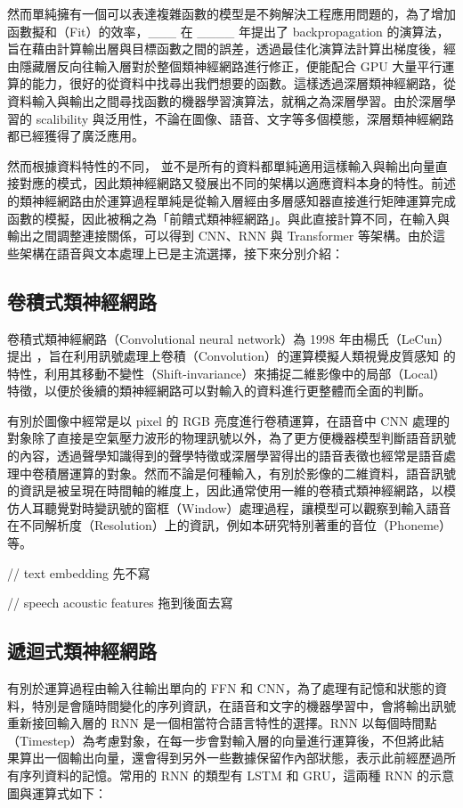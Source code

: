 然而單純擁有一個可以表達複雜函數的模型是不夠解決工程應用問題的，為了增加函數擬和（Fit）的效率，\_\_\_ 在 \_\_\_\_ 年提出了 backpropagation 的演算法，旨在藉由計算輸出層與目標函數之間的誤差，透過最佳化演算法計算出梯度後，經由隱藏層反向往輸入層對於整個類神經網路進行修正，便能配合 GPU 大量平行運算的能力，很好的從資料中找尋出我們想要的函數。這樣透過深層類神經網路，從資料輸入與輸出之間尋找函數的機器學習演算法，就稱之為深層學習。由於深層學習的 scalibility 與泛用性，不論在圖像、語音、文字等多個模態，深層類神經網路都已經獲得了廣泛應用。

然而根據資料特性的不同， 並不是所有的資料都單純適用這樣輸入與輸出向量直接對應的模式，因此類神經網路又發展出不同的架構以適應資料本身的特性。前述的類神經網路由於運算過程單純是從輸入層經由多層感知器直接進行矩陣運算完成函數的模擬，因此被稱之為「前饋式類神經網路」。與此直接計算不同，在輸入與輸出之間調整連接關係，可以得到 CNN、RNN 與 Transformer 等架構。由於這些架構在語音與文本處理上已是主流選擇，接下來分別介紹：

\subsection{卷積式類神經網路}

卷積式類神經網路（Convolutional neural network）為 1998 年由楊氏（LeCun）提出 \cite{lecun_gradient-based_1998}，旨在利用訊號處理上卷積（Convolution）的運算模擬人類視覺皮質感知 \cite{hubel_receptive_1959} 的特性，利用其移動不變性（Shift-invariance）來捕捉二維影像中的局部（Local）特徵，以便於後續的類神經網路可以對輸入的資料進行更整體而全面的判斷。

有別於圖像中經常是以 pixel 的 RGB 亮度進行卷積運算，在語音中 CNN 處理的對象除了直接是空氣壓力波形的物理訊號以外，為了更方便機器模型判斷語音訊號的內容，透過聲學知識得到的聲學特徵或深層學習得出的語音表徵也經常是語音處理中卷積層運算的對象。然而不論是何種輸入，有別於影像的二維資料，語音訊號的資訊是被呈現在時間軸的維度上，因此通常使用一維的卷積式類神經網路，以模仿人耳聽覺對時變訊號的窗框（Window）處理過程，讓模型可以觀察到輸入語音在不同解析度（Resolution）上的資訊，例如本研究特別著重的音位（Phoneme）等。

// text embedding 先不寫

// speech acoustic features 拖到後面去寫

\subsection{遞迴式類神經網路}

有別於運算過程由輸入往輸出單向的 FFN 和 CNN，為了處理有記憶和狀態的資料，特別是會隨時間變化的序列資訊，在語音和文字的機器學習中，會將輸出訊號重新接回輸入層的 RNN 是一個相當符合語言特性的選擇。RNN 以每個時間點（Timestep）為考慮對象，在每一步會對輸入層的向量進行運算後，不但將此結果算出一個輸出向量，還會得到另外一些數據保留作內部狀態，表示此前經歷過所有序列資料的記憶。常用的 RNN 的類型有 LSTM 和 GRU，這兩種 RNN 的示意圖與運算式如下：

